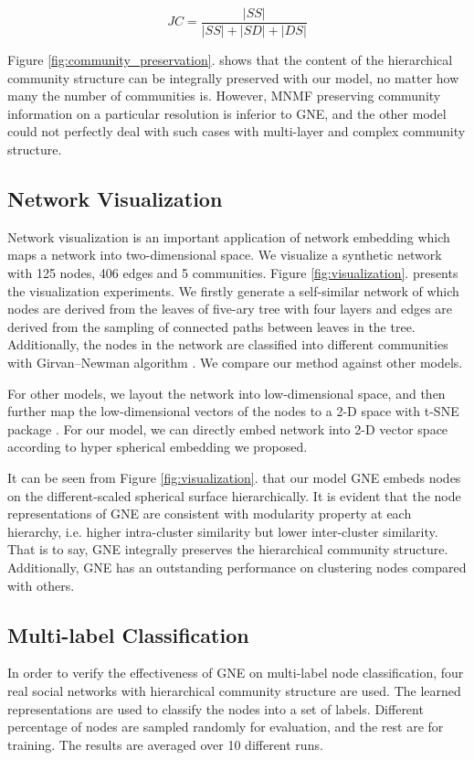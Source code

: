 \documentclass{article}
\theoremstyle{definition}
\begin{document}
	\begin{equation}
			JC = \frac{|SS|}{|SS|+|SD|+|DS|}
	\end{equation}


	Figure \ref{fig:community_preservation}. shows that the content of the hierarchical community structure can be integrally preserved with our model, no matter how many the number of communities is. However, MNMF preserving community information on a particular resolution is inferior to GNE, and the other model could not perfectly deal with such cases with multi-layer and complex community structure.

	


	\subsection{Network Visualization}
	Network visualization is an important application of network embedding which maps a network into two-dimensional space. We visualize a synthetic network with 125 nodes, 406 edges and 5 communities. Figure \ref{fig:visualization}. presents the visualization experiments. We firstly generate a self-similar network of which nodes are derived from the leaves of five-ary tree with four layers and edges are derived from the sampling of connected paths between leaves in the tree. Additionally, the nodes in the network are classified into different communities with Girvan–Newman algorithm \cite{girvan2002community}. We compare our method against other models.

	For other models, we layout the network into low-dimensional space, and then further map the low-dimensional vectors of the nodes to a 2-D space with t-SNE package \cite{Maaten2008Visualizing}. For our model, we can directly embed network into 2-D vector space according to hyper spherical embedding we proposed.

	It can be seen from Figure \ref{fig:visualization}. that our model GNE embeds nodes on the different-scaled spherical surface hierarchically. It is evident that the node representations of GNE are consistent with modularity property at each hierarchy, i.e. higher intra-cluster similarity but lower inter-cluster similarity. That is to say, GNE integrally preserves the hierarchical community structure. Additionally, GNE has an outstanding performance on clustering nodes compared with others.

	

	\subsection{Multi-label Classification}
	In order to verify the effectiveness of GNE on multi-label node classification, four real social networks with hierarchical community structure are used. The learned representations are used to classify the nodes into a set of labels. Different percentage of nodes are sampled randomly for evaluation, and the rest are for training. The results are averaged over 10 different runs. 
\end{document}

